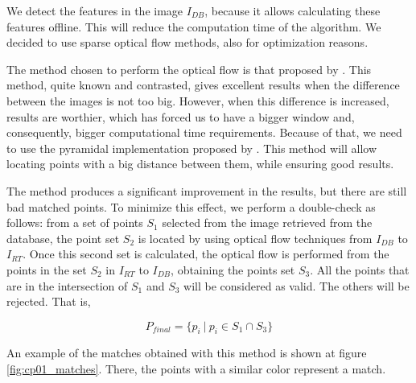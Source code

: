 We detect the features in the image $I_{DB}$, because it allows calculating these features offline. This will reduce the computation time of the algorithm. We decided to use sparse optical flow methods, also for optimization reasons.

The method chosen to perform the optical flow is that proposed by \cite{lucas1981iterative}. This method, quite known and contrasted, gives excellent results when the difference between the images is not too big. However, when this difference is increased, results are worthier, which has forced us to have a bigger window and, consequently, bigger computational time requirements. Because of that, we need to use the pyramidal implementation proposed by \cite{bouguet2001pyramidal}. This method will allow locating points with a big distance between them, while ensuring good results.

The \cite{bouguet2001pyramidal} method produces a significant improvement in the results, but there are still bad matched points. To minimize this effect, we perform a double-check as follows: from a set of points $S_1$ selected from the image retrieved from the database, the point set $S_2$ is located by using optical flow techniques from $I_{DB}$ to $I_{RT}$. Once this second set is calculated, the optical flow is performed from the points in the set $S_2$ in $I_{RT}$ to $I_{DB}$, obtaining the points set $S_3$. All the points that are in the intersection of $S_1$ and $S_3$ will be considered as valid. The others will be rejected. That is,

\begin{equation}\label{eq:cp01_rejected_points}
P_{final} = \{ p_i ~|~ p_i \in S_1 \cap S_3 \}
\end{equation}

An example of the matches obtained with this method is shown at figure \ref{fig:cp01_matches}. There, the points with a similar color represent a match.

